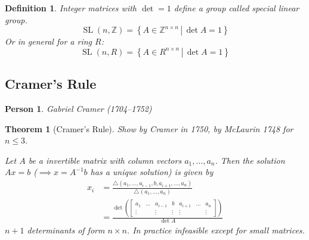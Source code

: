\documentclass[a4paper]{article}
\newcounter{lecref}[section]
\numberwithin{lecref}{section}
\newtheorem{theorem}[lecref]{Theorem}
\newtheorem{definition}[lecref]{Definition}
\newtheorem*{Person}{Person}
\newcommand{\setdef}[2]{\left\{\left.#1\,\right|\,#2\right\}}
\begin{document}
\begin{definition}
  Integer matrices with $\det = 1$ define a group called \emph{special linear group}.
  \[ \operatorname{SL}(n, \mathbb Z) = \setdef{A \in \mathbb Z^{n \times n}}{\det{A} = 1} \]
  Or in general for a ring $R$:
  \[ \operatorname{SL}(n, R) = \setdef{A \in R^{n \times n}}{\det{A} = 1} \]
\end{definition}

\subsection{Cramer's Rule}

\begin{Person}
  Gabriel Cramer (1704--1752)
\end{Person}

\begin{theorem}[Cramer's Rule]
  Show by Cramer in 1750, by McLaurin 1748 for $n \leq 3$.

  Let $A$ be a invertible matrix with column vectors $a_1, \dots, a_n$.
  Then the solution $Ax = b$ ($\implies x = A^{-1} b$ has a unique solution) is given by
  \begin{align*}
    x_i &= \frac{\triangle (a_1, \dots, a_{i-1}, b, a_{i+1}, \dots, a_n)}{\triangle (a_1, \dots, a_n)} \\
        &= \frac{\det\left(\begin{bmatrix} a_1 & \dots & a_{i-1} & b & a_{i+1} & \dots & a_{n} \\ \vdots &  & \vdots & \vdots & \vdots & & \vdots \end{bmatrix}\right)}{\det{A}}
  \end{align*}
  $n+1$ determinants of form $n \times n$. In practice infeasible except for small matrices.
\end{theorem}
\end{document}
